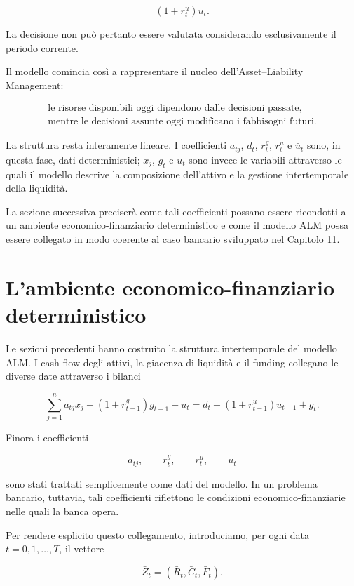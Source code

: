 \[
(1+r^u_t)u_t.
\]

La decisione non pu\`o pertanto essere valutata considerando esclusivamente il
periodo corrente.

Il modello comincia cos\`i a rappresentare il nucleo dell'Asset--Liability
Management:

\[
\boxed{
\begin{array}{c}
\text{le risorse disponibili oggi dipendono dalle decisioni passate,}\\
\text{mentre le decisioni assunte oggi modificano i fabbisogni futuri.}
\end{array}
}
\]

La struttura resta interamente lineare. I coefficienti $a_{tj}$, $d_t$,
$r^g_t$, $r^u_t$ e $\bar{u}_t$ sono, in questa fase, dati deterministici;
$x_j$, $g_t$ e $u_t$ sono invece le variabili attraverso le quali il modello
descrive la composizione dell'attivo e la gestione intertemporale della
liquidit\`a.

La sezione successiva preciser\`a come tali coefficienti possano essere
ricondotti a un ambiente economico-finanziario deterministico e come il
modello ALM possa essere collegato in modo coerente al caso bancario
sviluppato nel Capitolo 11.

\section{L'ambiente economico-finanziario deterministico}

\label{sec:cap12-ambiente-deterministico}

Le sezioni precedenti hanno costruito la struttura intertemporale del modello
ALM. I cash flow degli attivi, la giacenza di liquidit\`a e il funding
collegano le diverse date attraverso i bilanci

\[
\sum_{j=1}^{n}a_{tj}x_j
+
(1+r^g_{t-1})g_{t-1}
+
u_t
=
d_t
+
(1+r^u_{t-1})u_{t-1}
+
g_t.
\]

Finora i coefficienti

\[
a_{tj},\qquad r^g_t,\qquad r^u_t,\qquad \bar{u}_t
\]

\noindent sono stati trattati semplicemente come dati del modello. In un problema
bancario, tuttavia, tali coefficienti riflettono le condizioni
economico-finanziarie nelle quali la banca opera.

Per rendere esplicito questo collegamento, introduciamo, per ogni data
$t=0,1,\ldots,T$, il vettore

\[
\bar{Z}_t
=
\left(
\bar{R}_t,\bar{C}_t,\bar{F}_t
\right).
\]

